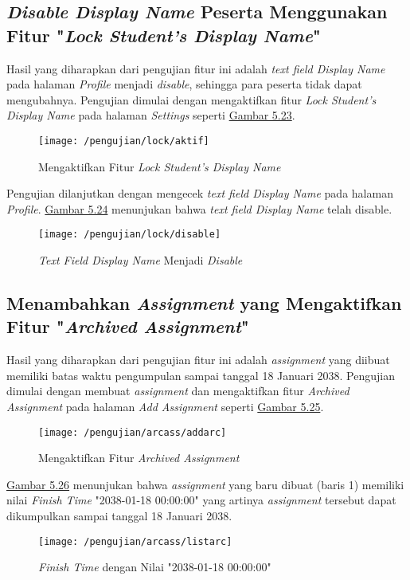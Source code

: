 	\subsection{\textit{Disable Display Name} Peserta Menggunakan Fitur "\textit{Lock Student's Display Name}"}
	Hasil yang diharapkan dari pengujian fitur ini adalah \textit{text field Display Name} pada halaman \textit{Profile} menjadi \textit{disable}, sehingga para peserta tidak dapat mengubahnya. Pengujian dimulai dengan mengaktifkan fitur \textit{Lock Student's Display Name} pada halaman \textit{Settings} seperti \hyperref[fig:aktif]{Gambar 5.23}.
	\begin{figure}[H]
		\centering  
		\texttt{[image: /pengujian/lock/aktif]}  
		\caption[Mengaktifkan Fitur \textit{Lock Student's Display Name}]{Mengaktifkan Fitur \textit{Lock Student's Display Name}} 
		\label{fig:aktif} 
	\end{figure}
	
	Pengujian dilanjutkan dengan mengecek \textit{text field Display Name} pada halaman \textit{Profile}. \hyperref[fig:disable]{Gambar 5.24} menunjukan bahwa \textit{text field Display Name} telah disable.
	\begin{figure}[H]
		\centering  
		\texttt{[image: /pengujian/lock/disable]}  
		\caption[\textit{Text Field Display Name} Menjadi \textit{Disable}]{\textit{Text Field Display Name} Menjadi \textit{Disable}} 
		\label{fig:disable} 
	\end{figure}

	\subsection{Menambahkan \textit{Assignment} yang Mengaktifkan Fitur "\textit{Archived Assignment}"}
	Hasil yang diharapkan dari pengujian fitur ini adalah \textit{\textit{assignment}} yang diibuat memiliki batas waktu pengumpulan sampai tanggal 18 Januari 2038. Pengujian dimulai dengan membuat \textit{assignment} dan mengaktifkan fitur \textit{Archived Assignment} pada halaman \textit{Add Assignment} seperti \hyperref[fig:arc]{Gambar 5.25}.
	\begin{figure}[H]
		\centering  
		\texttt{[image: /pengujian/arcass/addarc]}  
		\caption[Mengaktifkan Fitur \textit{Archived Assignment}]{Mengaktifkan Fitur \textit{Archived Assignment}} 
		\label{fig:arc} 
	\end{figure}
	
	\hyperref[fig:listarc]{Gambar 5.26} menunjukan bahwa \textit{assignment} yang baru dibuat (baris 1) memiliki nilai \textit{Finish Time} "2038-01-18 00:00:00" yang artinya \textit{assignment} tersebut dapat dikumpulkan sampai tanggal 18 Januari 2038.
	\begin{figure}[H]
		\centering  
		\texttt{[image: /pengujian/arcass/listarc]}  
		\caption[\textit{Finish Time} dengan Nilai "2038-01-18 00:00:00"]{\textit{Finish Time} dengan Nilai "2038-01-18 00:00:00"} 
		\label{fig:listarc} 
	\end{figure}

